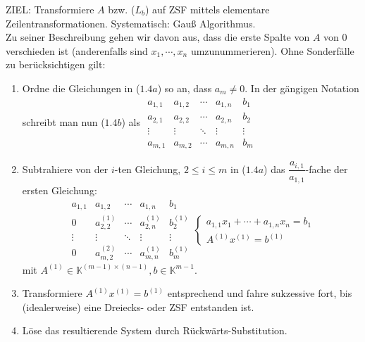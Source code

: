ZIEL: Transformiere $A$ bzw. ($L_b$) auf ZSF mittels elementare Zeilentransformationen.  Systematisch: Gauß Algorithmus.\\
Zu seiner Beschreibung gehen wir davon aus, dass die erste Spalte von $A$ von $0$ verschieden ist (anderenfalls sind $x_1,\cdots ,x_n$ umzunummerieren).  Ohne Sonderfälle zu berücksichtigen gilt:
\begin{enumerate}
\item Ordne die Gleichungen in ($1.4a$) so an, dass $a_m\not= 0$.  In der gängigen Notation schreibt man nun ($1.4b$) als $\begin{array}{cccc|c}a_{1,1} & a_{1,2} & \cdots & a_{1,n} & b_1\\a_{2,1} & a_{2,2} & \cdots & a_{2,n} & b_2\\\vdots & \vdots & \ddots &\vdots &\vdots \\a_{m,1} & a_{m,2} & \cdots & a_{m,n} & b_m\end{array}$
\item Subtrahiere von der $i$-ten Gleichung, $2\leq i\leq m$ in ($1.4a$) das $\dfrac{a_{i,1}}{a_{1,1}}$-fache der ersten Gleichung: 
\[\begin{array}{cccc|c}a_{1,1} & a_{1,2} & \cdots & a_{1,n} & b_1\\0 & a_{2,2}^{(1)} & \cdots & a_{2,n}^{(1)} & b_2^{(1)}\\ \vdots &\vdots &\ddots &\vdots &\vdots \\0 & a_{m,2}^{(2)} & \cdots & a_{m,n}^{(1)} & b_m^{(1)}\end{array} \begin{cases}a_{1,1}x_1+\cdots + a_{1,n}x_n=b_1 \\ A^{(1)}x^{(1)} = b^{(1)}\end{cases}\]
mit $A^{(1)}\in\mathbb{K}^{(m-1)\times (n-1)},b\in \mathbb{K}^{m-1}$.
\item Transformiere $A^{(1)}x^{(1)} = b^{(1)}$ entsprechend und fahre sukzessive fort, bis (idealerweise) eine Dreiecks- oder ZSF entstanden ist.
\item Löse das resultierende System durch Rückwärts-Substitution.
\end{enumerate}
